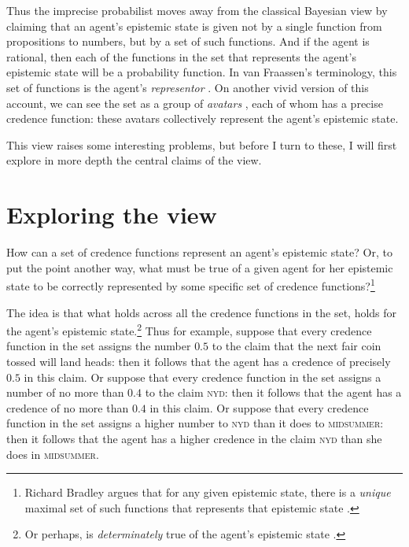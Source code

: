 Thus the imprecise probabilist moves away from the classical Bayesian view by claiming that an agent's epistemic state is given not by a single function from propositions to numbers, but by a set of such functions. And if the agent is rational, then each of the functions in the set that represents the agent's epistemic state will be a probability function. In van Fraassen's terminology, this set of functions is the agent's \textit{representor} \citep{vanfraassen1990}. On another vivid version of this account, we can see the set as a group of \textit{avatars} \citep{bradley2009}, each of whom has a precise credence function: these avatars collectively represent the agent's epistemic state.
 
This view raises some interesting problems, but before I turn to these, I will first explore in more depth the central claims of the view.


\section{Exploring the view}

How can a set of credence functions represent an agent's epistemic state? Or, to put the point another way, what must be true of a given agent for her epistemic state to be correctly represented by some specific set of credence functions?\footnote{Richard Bradley argues that for any given epistemic state, there is a \emph{unique} maximal set of such functions that represents that epistemic state \citep[242]{bradley2009}.}  

The idea is that what holds across all the credence functions in the set, holds for the agent's epistemic state.\footnote{Or perhaps, is \emph{determinately} true of the agent's epistemic state \citep{rinard2015}.} Thus for example, suppose that every credence function in the set assigns the number $0.5$ to the claim that the next fair coin tossed will land heads: then it follows that the agent has a credence of precisely $0.5$ in this claim. Or suppose that every credence function in the set assigns a number of no more than $0.4$ to the claim \textsc{nyd}: then it follows that the agent has a credence of no more than $0.4$ in this claim. Or suppose that every credence function in the set assigns a higher number to \textsc{nyd} than it does to \textsc{midsummer}: then it follows that the agent has a higher credence in the claim \textsc{nyd} than she does in \textsc{midsummer}. 

